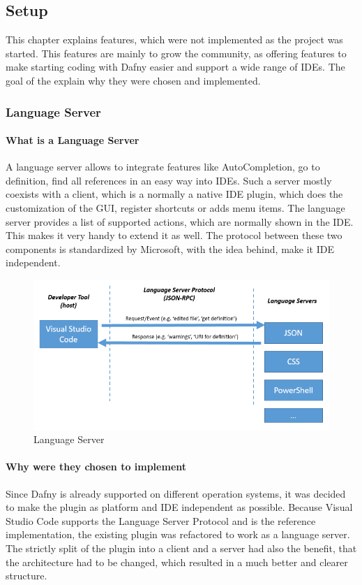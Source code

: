 \subsection{Setup}\label{setup}
This chapter explains features, which were not implemented as the project was started. This features are mainly to grow the community, as offering features to make starting coding with Dafny easier and support a wide range of IDEs. The goal of the explain why they were chosen and implemented. 

\subsubsection{Language Server} \label{setupLanguageServer}

\paragraph{What is a Language Server}
A language server allows to integrate features like AutoCompletion, go to definition, find all references in an easy way into IDEs. Such a server mostly coexists with a client, which is a normally a native IDE plugin, which does the customization of the GUI, register shortcuts or adds menu items. The language server provides a list of supported actions, which are normally shown in the IDE. This makes it very handy to extend it as well. 
The protocol between these two components is standardized by Microsoft, with the idea behind, make it IDE independent. 
 \newline
\begin{figure}[H]
	\centering
	\includegraphics[width=1.0\textwidth]{img/languageServer}
	\caption{Language Server}
	\label{fig:languageServer}
\end{figure}


\paragraph{Why were they chosen to implement}
Since Dafny is already supported on different operation systems, it was decided to make the plugin as platform and IDE independent as possible. Because Visual Studio Code supports the Language Server Protocol and is the reference implementation, the existing plugin was refactored to work as a language server. The strictly split of the plugin into a client and a server had also the benefit, that the architecture had to be changed, which resulted in a much better and clearer structure. \newline

